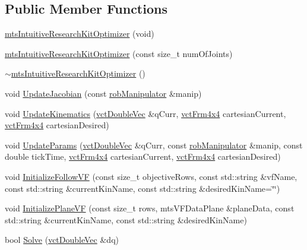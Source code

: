 \subsection*{Public Member Functions}
\begin{DoxyCompactItemize}
\item 
\hyperlink{classmts_intuitive_research_kit_optimizer_af160a886afc7ade0e09a70492774604d}{mts\-Intuitive\-Research\-Kit\-Optimizer} (void)
\item 
\hyperlink{classmts_intuitive_research_kit_optimizer_a1fd1f5d52df0c43a0ed45b2e9147801b}{mts\-Intuitive\-Research\-Kit\-Optimizer} (const size\-\_\-t num\-Of\-Joints)
\item 
\hyperlink{classmts_intuitive_research_kit_optimizer_a6c1bb4177eff53d8dbe8224c591cfe91}{$\sim$mts\-Intuitive\-Research\-Kit\-Optimizer} ()
\item 
void \hyperlink{classmts_intuitive_research_kit_optimizer_a05bdadeaebb6088921f840c84769511c}{Update\-Jacobian} (const \hyperlink{classrob_manipulator}{rob\-Manipulator} \&manip)
\item 
void \hyperlink{classmts_intuitive_research_kit_optimizer_a6b9b58fa536eb466fd511d02ef99d7d2}{Update\-Kinematics} (\hyperlink{vct_dynamic_vector_types_8h_ade4b3068c86fb88f41af2e5187e491c2}{vct\-Double\-Vec} \&q\-Curr, \hyperlink{vct_transformation_types_8h_a33da47f4deb2556b37a69a2c44b29d75}{vct\-Frm4x4} cartesian\-Current, \hyperlink{vct_transformation_types_8h_a33da47f4deb2556b37a69a2c44b29d75}{vct\-Frm4x4} cartesian\-Desired)
\item 
void \hyperlink{classmts_intuitive_research_kit_optimizer_a63904f22f0ee3d20eb683f7576f9923f}{Update\-Params} (\hyperlink{vct_dynamic_vector_types_8h_ade4b3068c86fb88f41af2e5187e491c2}{vct\-Double\-Vec} \&q\-Curr, const \hyperlink{classrob_manipulator}{rob\-Manipulator} \&manip, const double tick\-Time, \hyperlink{vct_transformation_types_8h_a33da47f4deb2556b37a69a2c44b29d75}{vct\-Frm4x4} cartesian\-Current, \hyperlink{vct_transformation_types_8h_a33da47f4deb2556b37a69a2c44b29d75}{vct\-Frm4x4} cartesian\-Desired)
\item 
void \hyperlink{classmts_intuitive_research_kit_optimizer_aef0de374260f326d4c49f7f8598d9eda}{Initialize\-Follow\-V\-F} (const size\-\_\-t objective\-Rows, const std\-::string \&vf\-Name, const std\-::string \&current\-Kin\-Name, const std\-::string \&desired\-Kin\-Name=\char`\"{}\char`\"{})
\item 
void \hyperlink{classmts_intuitive_research_kit_optimizer_a6928383d7ecd2e6e1fcd0281ff7e37c6}{Initialize\-Plane\-V\-F} (const size\-\_\-t rows, mts\-V\-F\-Data\-Plane \&plane\-Data, const std\-::string \&current\-Kin\-Name, const std\-::string \&desired\-Kin\-Name)
\item 
bool \hyperlink{classmts_intuitive_research_kit_optimizer_a91dcdb8e78fe389d008ee470d3e163b9}{Solve} (\hyperlink{vct_dynamic_vector_types_8h_ade4b3068c86fb88f41af2e5187e491c2}{vct\-Double\-Vec} \&dq)
\end{DoxyCompactItemize}
